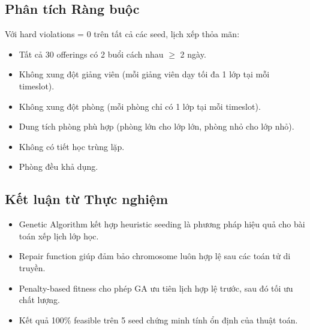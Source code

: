 \subsection{Phân tích Ràng buộc}
Với hard violations = 0 trên tất cả các seed, lịch xếp thỏa mãn:
\begin{itemize}
    \item Tất cả 30 offerings có 2 buổi cách nhau $\geq$ 2 ngày.
    \item Không xung đột giảng viên (mỗi giảng viên dạy tối đa 1 lớp tại mỗi timeslot).
    \item Không xung đột phòng (mỗi phòng chỉ có 1 lớp tại mỗi timeslot).
    \item Dung tích phòng phù hợp (phòng lớn cho lớp lớn, phòng nhỏ cho lớp nhỏ).
    \item Không có tiết học trùng lặp.
    \item Phòng đều khả dụng.
\end{itemize}

\subsection{Kết luận từ Thực nghiệm}
\begin{itemize}
    \item Genetic Algorithm kết hợp heuristic seeding là phương pháp hiệu quả cho bài toán xếp lịch lớp học.
    \item Repair function giúp đảm bảo chromosome luôn hợp lệ sau các toán tử di truyền.
    \item Penalty-based fitness cho phép GA ưu tiên lịch hợp lệ trước, sau đó tối ưu chất lượng.
    \item Kết quả 100\% feasible trên 5 seed chứng minh tính ổn định của thuật toán.
\end{itemize}
